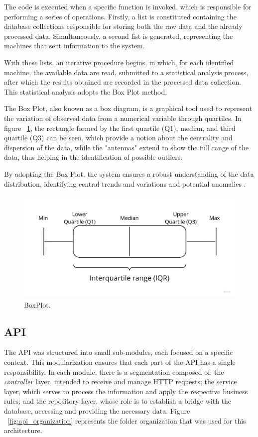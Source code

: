 The code is executed when a specific function is invoked, which is responsible for performing a series of operations. Firstly, a list is constituted containing the database collections responsible for storing both the raw data and the already processed data. Simultaneously, a second list is generated, representing the machines that sent information to the system.

With these lists, an iterative procedure begins, in which, for each identified machine, the available data are read, submitted to a statistical analysis process, after which the results obtained are recorded in the processed data collection. This statistical analysis adopts the Box Plot method.

The Box Plot, also known as a box diagram, is a graphical tool used to represent the variation of observed data from a numerical variable through quartiles. In figure ~\ref{fig:boxplot}, the rectangle formed by the first quartile (Q1), median, and third quartile (Q3) can be seen, which provide a notion about the centrality and dispersion of the data, while the "antennas" extend to show the full range of the data, thus helping in the identification of possible outliers.

By adopting the Box Plot, the system ensures a robust understanding of the data distribution, identifying central trends and variations and potential anomalies \cite{marmolejo2010shifting}.

\begin{figure}[htbp]
	\centering
	\includegraphics[scale=0.1]{images/boxplot.jpg}
	\caption{BoxPlot.}
	\label{fig:boxplot}
\end{figure}


\subsection{API}\label{subsec:apiArchitecture}
The \gls{API} was structured into small sub-modules, each focused on a specific context. This modularization ensures that each part of the \gls{API} has a single responsibility. In each module, there is a segmentation composed of: the \textit{controller} layer, intended to receive and manage \gls{HTTP} requests; the service layer, which serves to process the information and apply the respective business rules; and the repository layer, whose role is to establish a bridge with the database, accessing and providing the necessary data. Figure ~\ref{fig:api_organization} represents the folder organization that was used for this architecture.

